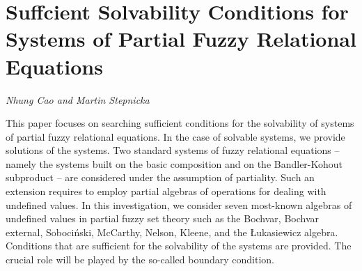 \documentclass[../booklet.tex]{subfiles}
\begin{document}
\section[Suffcient Solvability Conditions for Systems of Partial Fuzzy Relational Equations. {\it Nhung Cao and Martin Stepnicka}]{Suffcient Solvability Conditions for Systems of Partial Fuzzy Relational Equations}
 

\begin{center}
  {\it Nhung Cao and Martin Stepnicka}
\end{center}

\vskip 0.8cm


This paper focuses on searching sufficient conditions for the solvability of systems of partial fuzzy relational equations. In the case of solvable systems, we provide solutions of the systems. Two standard systems of fuzzy relational equations -- namely the systems built on the basic composition and on the Bandler-Kohout subproduct -- are considered under the assumption of partiality. Such an extension requires to employ partial algebras of operations for dealing with undefined values. In this investigation, we consider seven most-known algebras of undefined values in partial fuzzy set theory such as the Bochvar, Bochvar external, Soboci\'{n}ski, McCarthy, Nelson, Kleene, and the \L{}ukasiewicz algebra. Conditions that are sufficient for the solvability of the systems are provided. The crucial role will be played by the so-called  boundary condition.  

\end{document}
